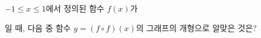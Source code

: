 $-1\le x\le 1$에서 정의된 함수 $f(x)$가\par\smallskip{}\par\smallskip\noindent 일 때, 다음 중 함수 $y=(f\circ f)(x)$의 그래프의 개형으로 알맞은 것은?
\begin{choicesii}{}{}{}{}{}\end{choicesii}
